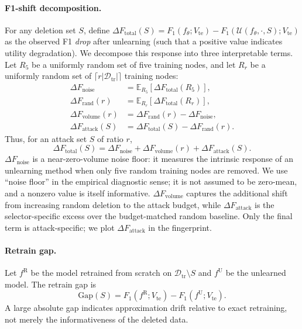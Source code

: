 \paragraph{F1-shift decomposition.}
For any deletion set $S$, define
$\Delta F_{\text{total}}(S) = F_1(f_\theta;V_{\text{te}}) - F_1(\mathcal{U}(f_\theta,\cdot,S);V_{\text{te}})$
as the observed F1 \emph{drop} after unlearning (such that a positive
value indicates utility degradation). We decompose this response into
three interpretable terms. Let $R_5$ be a uniformly random set of five
training nodes, and let $R_r$ be a uniformly random set of
$\lceil r|\mathcal{D}_{\text{tr}}|\rceil$ training nodes:
\begin{align}
\Delta F_{\text{noise}}
&= \mathbb{E}_{R_5}
   [\Delta F_{\text{total}}(R_5)], \\
\Delta F_{\text{rand}}(r)
&= \mathbb{E}_{R_r}
   [\Delta F_{\text{total}}(R_r)], \\
\Delta F_{\text{volume}}(r)
&= \Delta F_{\text{rand}}(r)-\Delta F_{\text{noise}}, \\
\Delta F_{\text{attack}}(S)
&= \Delta F_{\text{total}}(S)-\Delta F_{\text{rand}}(r).
\end{align}
Thus, for an attack set $S$ of ratio $r$,
\begin{equation}
\label{eq:fshift}
\Delta F_{\text{total}}(S)
= \Delta F_{\text{noise}}
 + \Delta F_{\text{volume}}(r)
 + \Delta F_{\text{attack}}(S).
\end{equation}
$\Delta F_{\text{noise}}$ is a near-zero-volume noise floor: it measures
the intrinsic response of an unlearning method when only five random
training nodes are removed. We use ``noise floor'' in the empirical
diagnostic sense; it is not assumed to be zero-mean, and a nonzero value
is itself informative. $\Delta F_{\text{volume}}$ captures the additional
shift from increasing random deletion to the attack budget, while
$\Delta F_{\text{attack}}$ is the selector-specific excess over the
budget-matched random baseline. Only the final term is attack-specific;
we plot $\Delta F_{\text{attack}}$ in the fingerprint.

\paragraph{Retrain gap.} Let $f^{\mathrm{R}}$ be the model retrained from
scratch on $\mathcal{D}_{\mathrm{tr}}\setminus S$ and $f^{\mathrm{U}}$ be
the unlearned model. The retrain gap is
\[
\mathrm{Gap}(S)
= F_1(f^{\mathrm{R}};V_{\mathrm{te}})
 - F_1(f^{\mathrm{U}};V_{\mathrm{te}}).
\]
A large absolute gap indicates approximation drift relative to exact
retraining, not merely the informativeness of the deleted data.

